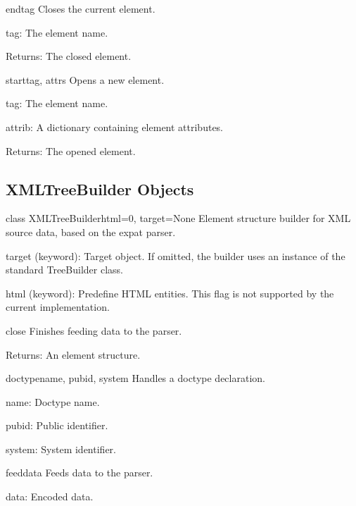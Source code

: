 \begin{methoddesc}{end}{tag}
Closes the current element.

tag: The element name.

Returns: The closed element.
\end{methoddesc}

\begin{methoddesc}{start}{tag, attrs}
Opens a new element.

tag: The element name.

attrib: A dictionary containing element attributes.

Returns: The opened element.
\end{methoddesc}


\subsection{XMLTreeBuilder Objects\label{elementtree-xmltreebuilder-objects}}

\begin{classdesc}{class XMLTreeBuilder}{html=0, target=None}
Element structure builder for XML source data, based on the
expat parser.

target (keyword): Target object.  If omitted, the builder uses an
instance of the standard TreeBuilder class.

html (keyword): Predefine HTML entities.  This flag is not supported
by the current implementation.
\end{classdesc}

\begin{methoddesc}{close}{}
Finishes feeding data to the parser.

\begin{datadescni}{Returns:}
An element structure.
\end{datadescni}
\end{methoddesc}

\begin{methoddesc}{doctype}{name, pubid, system}
Handles a doctype declaration.

name: Doctype name.

pubid: Public identifier.

system: System identifier.
\end{methoddesc}

\begin{methoddesc}{feed}{data}
Feeds data to the parser.

data: Encoded data.
\end{methoddesc}

